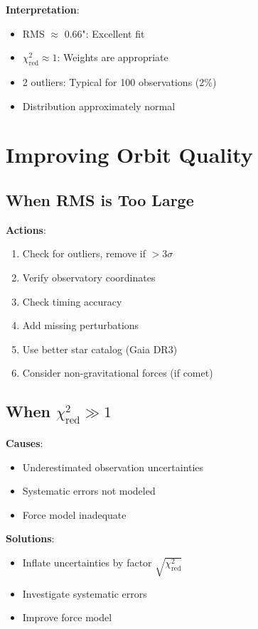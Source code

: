 \textbf{Interpretation}:
\begin{itemize}
    \item RMS $\approx$ 0.66": Excellent fit
    \item $\chi^2_{\text{red}} \approx 1$: Weights are appropriate
    \item 2 outliers: Typical for 100 observations (2\%)
    \item Distribution approximately normal
\end{itemize}

\section{Improving Orbit Quality}

\subsection{When RMS is Too Large}

\textbf{Actions}:
\begin{enumerate}
    \item Check for outliers, remove if $>$3$\sigma$
    \item Verify observatory coordinates
    \item Check timing accuracy
    \item Add missing perturbations
    \item Use better star catalog (Gaia DR3)
    \item Consider non-gravitational forces (if comet)
\end{enumerate}

\subsection{\texorpdfstring{When $\chi^2_{\text{red}} \gg 1$}{When Chi-Square is Large}}

\textbf{Causes}:
\begin{itemize}
    \item Underestimated observation uncertainties
    \item Systematic errors not modeled
    \item Force model inadequate
\end{itemize}

\textbf{Solutions}:
\begin{itemize}
    \item Inflate uncertainties by factor $\sqrt{\chi^2_{\text{red}}}$
    \item Investigate systematic errors
    \item Improve force model
\end{itemize}

